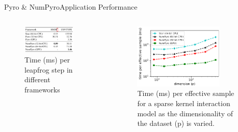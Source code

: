 \documentclass[AERbeamer%
              ,optEnglish%
              ,optBiber%
              ,optBibstyleAlphabetic%
              ,optBeamerClassicFormat%
              ]{AERlatex}%
\begin{document}
\begin{frame}[c]{Pyro \& NumPyro}{Application Performance}
    \centering
    \begin{columns}[T]
        \begin{column}{0.48\textwidth}
            \centering
            \vspace{0.5cm}
            \begin{figure}
                \centering
                \includegraphics[width=0.8\textwidth]{NumPyroBenchmarking1.png}
                \caption{Time (ms) per leapfrog step in different frameworks}
            \end{figure}
        \end{column}
        \begin{column}{0.48\textwidth}
            \centering
            \begin{figure}
                \centering
                \includegraphics[width=0.8\textwidth]{NumPyroBenchmarking2.png}
                \caption{Time (ms) per effective sample for a sparse kernel interaction model as the
                     dimensionality of the dataset (p) is varied.}
            \end{figure}
        \end{column}
    \end{columns}
\end{frame}
\end{document}
